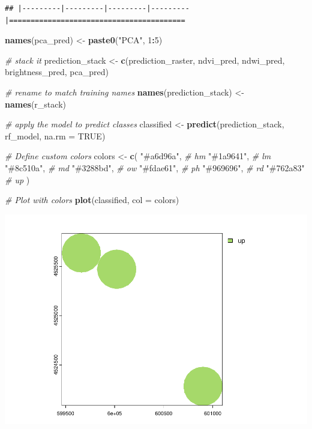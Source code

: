 \documentclass[
]{article}
\newenvironment{Shaded}{\begin{snugshade}}{\end{snugshade}}
\newcommand{\AttributeTok}[1]{\textcolor[rgb]{0.13,0.29,0.53}{#1}}
\newcommand{\CommentTok}[1]{\textcolor[rgb]{0.56,0.35,0.01}{\textit{#1}}}
\newcommand{\ConstantTok}[1]{\textcolor[rgb]{0.56,0.35,0.01}{#1}}
\newcommand{\DecValTok}[1]{\textcolor[rgb]{0.00,0.00,0.81}{#1}}
\newcommand{\FunctionTok}[1]{\textcolor[rgb]{0.13,0.29,0.53}{\textbf{#1}}}
\newcommand{\NormalTok}[1]{#1}
\newcommand{\OtherTok}[1]{\textcolor[rgb]{0.56,0.35,0.01}{#1}}
\newcommand{\SpecialCharTok}[1]{\textcolor[rgb]{0.81,0.36,0.00}{\textbf{#1}}}
\newcommand{\StringTok}[1]{\textcolor[rgb]{0.31,0.60,0.02}{#1}}
\begin{document}
\begin{verbatim}
## |---------|---------|---------|---------|=========================================                                          
\end{verbatim}

\begin{Shaded}
\begin{Highlighting}[]
\FunctionTok{names}\NormalTok{(pca\_pred) }\OtherTok{\textless{}{-}} \FunctionTok{paste0}\NormalTok{(}\StringTok{"PCA"}\NormalTok{, }\DecValTok{1}\SpecialCharTok{:}\DecValTok{5}\NormalTok{)}

\CommentTok{\# stack it}
\NormalTok{prediction\_stack }\OtherTok{\textless{}{-}} \FunctionTok{c}\NormalTok{(prediction\_raster, ndvi\_pred, ndwi\_pred, brightness\_pred, pca\_pred)}

\CommentTok{\# rename to match training names}
\FunctionTok{names}\NormalTok{(prediction\_stack) }\OtherTok{\textless{}{-}} \FunctionTok{names}\NormalTok{(r\_stack)}

\CommentTok{\# apply the model to predict classes}
\NormalTok{classified }\OtherTok{\textless{}{-}} \FunctionTok{predict}\NormalTok{(prediction\_stack, rf\_model, }\AttributeTok{na.rm =} \ConstantTok{TRUE}\NormalTok{)}

\CommentTok{\# Define custom colors}
\NormalTok{colors }\OtherTok{\textless{}{-}} \FunctionTok{c}\NormalTok{(}
  \StringTok{"\#a6d96a"}\NormalTok{,  }\CommentTok{\# hm  }
  \StringTok{"\#1a9641"}\NormalTok{,  }\CommentTok{\# lm  }
  \StringTok{"\#8c510a"}\NormalTok{,  }\CommentTok{\# md  }
  \StringTok{"\#3288bd"}\NormalTok{,  }\CommentTok{\# ow  }
  \StringTok{"\#fdae61"}\NormalTok{,  }\CommentTok{\# ph  }
  \StringTok{"\#969696"}\NormalTok{,  }\CommentTok{\# rd  }
  \StringTok{"\#762a83"}   \CommentTok{\# up  }
\NormalTok{)}



\CommentTok{\# Plot with colors}
\FunctionTok{plot}\NormalTok{(classified, }\AttributeTok{col =}\NormalTok{ colors)}
\end{Highlighting}
\end{Shaded}

\includegraphics{veg_model_files/figure-latex/unnamed-chunk-4-1.pdf}
\end{document}
